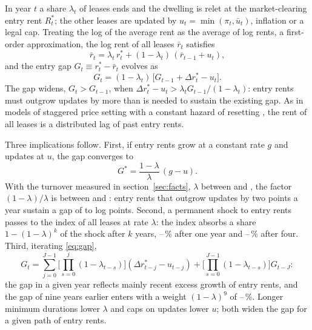 \documentclass[11pt,a4paper]{article}
\begin{document}
In year $t$ a share $\lambda_{t}$ of leases ends and the dwelling is relet at the market-clearing entry rent $R^*_{t}$; the other leases are updated by $u_t=\min(\pi_t,\bar u_t)$, inflation or a legal cap. Treating the log of the average rent as the average of log rents, a first-order approximation, the log rent of all leases $\bar r_{t}$ satisfies
\begin{equation}\label{eq:index}
\bar r_{t}=\lambda_{t}\,r^*_{t}+(1-\lambda_{t})\,(\bar r_{t-1}+u_t),
\end{equation}
and the entry gap $G_{t}\equiv r^*_{t}-\bar r_{t}$ evolves as
\begin{equation}\label{eq:gap}
G_{t}=(1-\lambda_{t})\,\big[G_{t-1}+\Delta r^*_{t}-u_t\big].
\end{equation}
The gap widens, $G_t>G_{t-1}$, when $\Delta r^*_t-u_t>\lambda_t G_{t-1}/(1-\lambda_t)$: entry rents must outgrow updates by more than is needed to sustain the existing gap. As in models of staggered price setting with a constant hazard of resetting \citep{calvo1983}, the rent of all leases is a distributed lag of past entry rents.

Three implications follow. First, if entry rents grow at a constant rate $g$ and updates at $u$, the gap converges to
\begin{equation}\label{eq:steady}
G^{\ast}=\frac{1-\lambda}{\lambda}\,(g-u).
\end{equation}
With the turnover measured in section~\ref{sec:facts}, $\lambda$ between \lamRangeLo{} and \lamRangeHi, the factor $(1-\lambda)/\lambda$ is between \mcRssLo{} and \mcRssHi: entry rents that outgrow updates by two points a year sustain a gap of \mcGssLo{} to \mcGssHi{} log points. Second, a permanent shock to entry rents passes to the index of all leases at rate $\lambda$: the index absorbs a share $1-(1-\lambda)^k$ of the shock after $k$ years, \mcAoneLo--\mcAoneHi\,\% after one year and \mcAfourLo--\mcAfourHi\,\% after four. Third, iterating \eqref{eq:gap},
\begin{equation}\label{eq:gapsum}
G_{t}=\sum_{j=0}^{J-1}\Big[\prod_{s=0}^{j}(1-\lambda_{t-s})\Big](\Delta r^*_{t-j}-u_{t-j})+\Big[\prod_{s=0}^{J-1}(1-\lambda_{t-s})\Big]G_{t-J}:
\end{equation}
the gap in a given year reflects mainly recent excess growth of entry rents, and the gap of nine years earlier enters with a weight $(1-\lambda)^9$ of \mcWgLo--\mcWgHi\,\%. Longer minimum durations lower $\lambda$ and caps on updates lower $u$; both widen the gap for a given path of entry rents.
\end{document}
